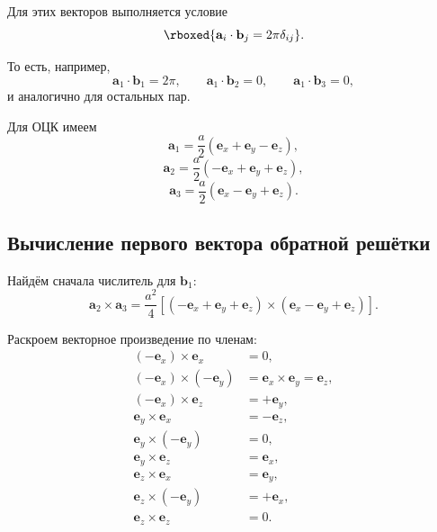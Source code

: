\documentclass[../final.tex]{subfiles}
\begin{document}
Для этих векторов выполняется условие
%
\begin{equation*}
    \rboxed{
        \mathbf a_i\cdot\mathbf b_j
        =
        2\pi\delta_{ij}
    }.
\end{equation*}

То есть, например,
%
\begin{equation*}
    \mathbf a_1\cdot\mathbf b_1=2\pi,
    \qquad
    \mathbf a_1\cdot\mathbf b_2=0,
    \qquad
    \mathbf a_1\cdot\mathbf b_3=0,
\end{equation*}
%
и аналогично для остальных пар.

Для ОЦК имеем
%
\begin{equation*}
    \mathbf a_1
    =
    \frac{a}{2}
    \left(
        \mathbf e_x+\mathbf e_y-\mathbf e_z
    \right),
\end{equation*}
%
\begin{equation*}
    \mathbf a_2
    =
    \frac{a}{2}
    \left(
        -\mathbf e_x+\mathbf e_y+\mathbf e_z
    \right),
\end{equation*}
%
\begin{equation*}
    \mathbf a_3
    =
    \frac{a}{2}
    \left(
        \mathbf e_x-\mathbf e_y+\mathbf e_z
    \right).
\end{equation*}



\subsection*{Вычисление первого вектора обратной решётки}

Найдём сначала числитель для $\mathbf b_1$:
%
\begin{equation*}
    \mathbf a_2\times\mathbf a_3
    =
    \frac{a^2}{4}
    \left[
        (-\mathbf e_x+\mathbf e_y+\mathbf e_z)
        \times
        (\mathbf e_x-\mathbf e_y+\mathbf e_z)
    \right].
\end{equation*}

Раскроем векторное произведение по членам:
%
\begin{align*}
    (-\mathbf e_x)\times\mathbf e_x
    &=
    0,
    \\
    (-\mathbf e_x)\times(-\mathbf e_y)
    &=
    \mathbf e_x\times\mathbf e_y
    =
    \mathbf e_z,
    \\
    (-\mathbf e_x)\times\mathbf e_z
    &=
    +\mathbf e_y,
    \\
    \mathbf e_y\times\mathbf e_x
    &=
    -\mathbf e_z,
    \\
    \mathbf e_y\times(-\mathbf e_y)
    &=
    0,
    \\
    \mathbf e_y\times\mathbf e_z
    &=
    \mathbf e_x,
    \\
    \mathbf e_z\times\mathbf e_x
    &=
    \mathbf e_y,
    \\
    \mathbf e_z\times(-\mathbf e_y)
    &=
    +\mathbf e_x,
    \\
    \mathbf e_z\times\mathbf e_z
    &=
    0.
\end{align*}
\end{document}
